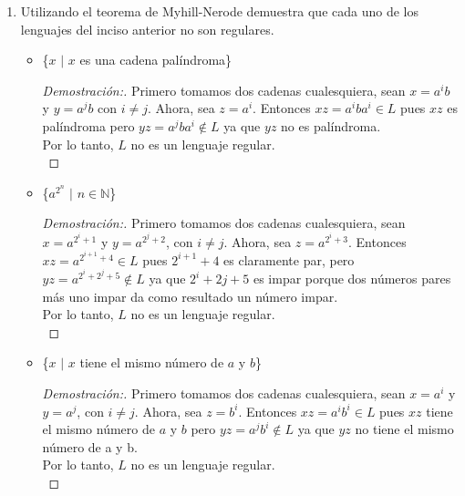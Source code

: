 \documentclass[letterpaper,11pt]{article}
\begin{document}
\begin{enumerate}
    \item Utilizando el teorema de Myhill-Nerode demuestra que cada uno de
    los lenguajes del inciso anterior no son regulares.
    \begin{itemize}
    
    \item \{$x$ $|$ $x$ es una cadena palíndroma\}
    \begin{proof}[Demostración:] Primero tomamos dos cadenas cualesquiera, 
    sean $x = a^{i}b$ y $y = a^{j}b$ con $i \neq j$. Ahora, sea $z = a^{i}$.
    Entonces $xz = a^{i}ba^{i} \in L$ pues $xz$ es palíndroma
    pero $yz = a^{j}ba^{i} \notin L$ ya que $yz$ no es palíndroma.\\
    Por lo tanto, $L$ no es un lenguaje regular.\\      
    \end{proof}
    
    \item \{$a^{2^{n}}$ $|$ $n \in \mathbb{N}$\}
    \begin{proof}[Demostración:] Primero tomamos dos cadenas cualesquiera,
    	sean $x = a^{2^{i}+1}$ y $y = a^{2^{j}+2}$, con $i \neq j$. Ahora,
    	sea $z = a^{2^{i}+3}$. Entonces $xz = a^{2^{i+1}+4} \in L$ pues 
    	$2^{i+1}+4$ es claramente par, pero $yz = a^{2^{i}+2^{j}+5} \notin L$
    	ya que $2^{i}+2{j}+5$ es impar porque dos números pares más uno impar
    	da como resultado un número impar.\\
    	Por lo tanto, $L$ no es un lenguaje regular.\\
    \end{proof}
    
    \item \{$x$ $|$ $x$ tiene el mismo número de $a$ y $b$\}
    \begin{proof}[Demostración:] Primero tomamos dos cadenas cualesquiera, 
    sean $x = a^{i}$ y $y = a^{j}$, con $i \neq j$. Ahora, sea $z = b^{i}$.
    Entonces $xz = a^{i}b^{i} \in L$ pues $xz$ tiene el mismo número de
    $a$ y $b$ pero $yz = a^{j}b^{i} \notin L$ ya que $yz$ no tiene el mismo
    número de a y b.\\
    Por lo tanto, $L$ no es un lenguaje regular.\\ 
    \end{proof}
    \end{itemize}
    
  \end{enumerate}
\end{document}

